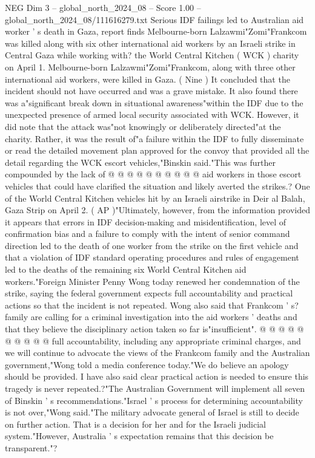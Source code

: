 \begin{textsample}{NEG Dim 3 – global\_north\_2024\_08 – Score 1.00 – global\_north\_2024\_08/111616279.txt}  \label{ex:f3_neg_318}
Serious IDF failings led to Australian aid worker ' s death in Gaza, report finds Melbourne-born Lalzawmi"Zomi"Frankcom was killed along with six other international aid workers by an Israeli strike in Central Gaza while working with? the World Central Kitchen ( WCK ) charity on April 1.
Melbourne-born Lalzawmi"Zomi"Frankcom, along with three other international aid workers, were killed in Gaza. ( Nine ) It concluded that the incident should not have occurred and was a grave mistake.
It also found there was a"significant break down in situational awareness"within the IDF due to the unexpected presence of armed local security associated with WCK.
However, it did note that the attack was"not knowingly or deliberately directed"at the charity.
Rather, it was the result of"a failure within the IDF to fully disseminate or read the detailed movement plan approved for the convoy that provided all the detail regarding the WCK escort vehicles,"Binskin said."This was further compounded by the lack of @ @ @ @ @ @ @ @ @ @ aid workers in those escort vehicles that could have clarified the situation and likely averted the strikes.?
One of the World Central Kitchen vehicles hit by an Israeli airstrike in Deir al Balah, Gaza Strip on April 2. ( AP )"Ultimately, however, from the information provided it appears that errors in IDF decision-making and misidentification, level of confirmation bias and a failure to comply with the intent of senior command direction led to the death of one worker from the strike on the first vehicle and that a violation of IDF standard operating procedures and rules of engagement led to the deaths of the remaining six World Central Kitchen aid workers."Foreign Minister Penny Wong today renewed her condemnation of the strike, saying the federal government expects full accountability and practical actions so that the incident is not repeated.
Wong also said that Frankcom ' s? family are calling for a criminal investigation into the aid workers ' deaths and that they believe the disciplinary action taken so far is"insufficient". @ @ @ @ @ @ @ @ @ @ full accountability, including any appropriate criminal charges, and we will continue to advocate the views of the Frankcom family and the Australian government,"Wong told a media conference today."We do believe an apology should be provided.
I have also said clear practical action is needed to ensure this tragedy is never repeated.?"The Australian Government will implement all seven of Binskin ' s recommendations."Israel ' s process for determining accountability is not over,"Wong said."The military advocate general of Israel is still to decide on further action.
That is a decision for her and for the Israeli judicial system."However, Australia ' s expectation remains that this decision be transparent."?

\end{textsample}
